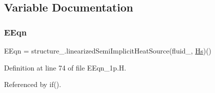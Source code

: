 \subsection{Variable Documentation}
\mbox{\label{EEqn__1p_8H_a48cf446ed1abc619ddcfc2b831bf4ed9}} 
\subsubsection{\texorpdfstring{E\+Eqn}{EEqn}}
{\footnotesize\ttfamily E\+Eqn = structure\+\_\+.\+linearized\+Semi\+Implicit\+Heat\+Source(fluid\+\_\+, \hyperlink{EEqn__1pl_8H_ab8fc5669aa3ba2d4b66ff43ff446d633}{Hs})()}



Definition at line 74 of file E\+Eqn\+\_\+1p.\+H.



Referenced by if().

